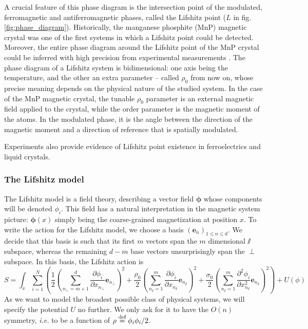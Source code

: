 A crucial feature of this phase diagram is the intersection point of the modulated, ferromagnetic and antiferromagnetic phases, called the Lifshitz point ($L$ in fig. \eqref{fig:phase_diagram}). 
Historically, the manganese phosphite (MnP) magnetic crystal was one of the first systems in which a Lifshitz point could be detected. Moreover, the entire phase diagram around the Lifshitz point of the MnP crystal could be inferred with high precision from experimental measurements \cite{MnP}.
The phase diagram of a Lifshitz system is bidimensional: one axis being the temperature, and the other an extra parameter -- called $\rho_0$ from now on, whose precise meaning depends on the physical nature of the studied system.
In the case of the MnP magnetic crystal, the tunable $\rho_0$ parameter is an external magnetic field applied to the crystal, while the order parameter  is the magnetic moment of the atoms. In the modulated phase, it is the angle between the direction of the magnetic moment and a direction of reference that is spatially modulated.

Experiments also provide evidence of Lifshitz point existence in ferroelectrics and liquid crystals.

\subsubsection{The Lifshitz model}

The Lifshitz model is a field theory, describing a vector field $\boldsymbol{\phi}$ whose components will be denoted $\phi_i$.
This field has a natural interpretation in the magnetic system picture: $\boldsymbol{\phi}(x)$ simply being the coarse-grained magnetization at position $x$.
 To write the action for the Lifshitz model, we choose a basis $(\mathbf{e}_n)_{1 \leq n \leq d}$. We decide that this basis is such that its first $m$ vectors span the $m$ dimensional $\sslash$ subspace, whereas the remaining $d-m$ base vectors unsurprisingly span the $\perp$ subspace. In this basis, the Lifshitz action is
\begin{equation}
S = \int_x \sum_{i=1}^N \left( \frac{1}{2} \left(\sum_{n_\perp=m+1}^{d}\frac{\partial \phi_i}{\partial x_{n_\perp}} \mathbf{e}_{n_\perp}\right)^2 + \frac{\rho_0}{2} \left(\sum_{n_\sslash=1}^{m}\frac{\partial \phi_i}{\partial x_{n_\sslash}} \mathbf{e}_{n_\sslash}\right)^2 + \frac{\sigma_0}{2} \left(\sum_{n_\sslash=1}^{m} \frac{\partial^2 \phi_i}{\partial x_{n_\sslash}^2} \mathbf{e}_{n_\sslash}\right)^2 \right) + U(\phi)
\end{equation}
As we want to model the broadest possible class of physical systems, we will specify the potential $U$ no further. We only ask for it to have the $O(n)$ symmetry, \textit{i.e.} to be a function of $\rho  \overset{\text{def}}{=}  \phi_i \phi_i/2$.

